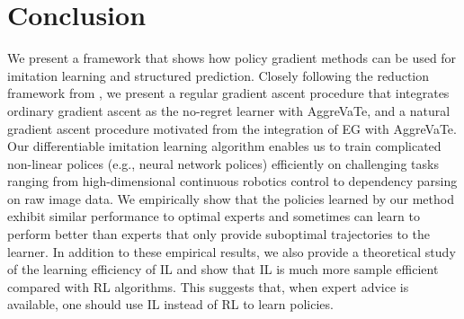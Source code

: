 \documentclass{article}
\begin{document}
\section{Conclusion}
We present a framework that shows how policy gradient methods can be used for imitation learning and structured prediction. Closely following the reduction framework from \citet{ross2014reinforcement}, we present a regular gradient ascent procedure that integrates ordinary gradient ascent as the no-regret learner with AggreVaTe, and a natural gradient ascent procedure motivated from the integration of EG with AggreVaTe. Our differentiable imitation learning algorithm enables us to train complicated non-linear polices (e.g., neural network polices) efficiently on challenging tasks ranging from high-dimensional continuous robotics control to dependency parsing on raw image data. We empirically show that the policies learned by our method exhibit similar performance to optimal experts and sometimes can learn to perform better than experts that only provide suboptimal trajectories to the learner. In addition to these empirical results, we also provide a theoretical study of the learning efficiency of IL and show that IL is much more sample efficient compared with RL algorithms. This suggests that, when expert advice is available, one should use IL instead of RL to learn policies.





\vspace{-5pt}

\end{document}
